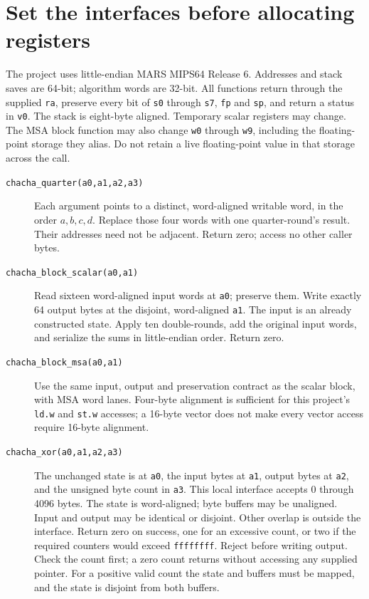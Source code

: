\section{Set the interfaces before allocating registers}
The project uses little-endian MARS MIPS64 Release 6. Addresses and stack saves are
64-bit; algorithm words are 32-bit. All functions return through the supplied
\texttt{ra}, preserve every bit of \texttt{s0} through \texttt{s7}, \texttt{fp} and
\texttt{sp}, and return a status in \texttt{v0}. The stack is eight-byte aligned.
Temporary scalar registers may change. The MSA block function may also change
\texttt{w0} through \texttt{w9}, including the floating-point storage they alias.
Do not retain a live floating-point value in that storage across the call.

\begin{description}
  \item[\texttt{chacha\_quarter(a0,a1,a2,a3)}]
        Each argument points to a distinct, word-aligned writable word, in the order
        \(a,b,c,d\). Replace those four words with one quarter-round's result. Their addresses
        need not be adjacent. Return zero; access no other caller bytes.
  \item[\texttt{chacha\_block\_scalar(a0,a1)}]
        Read sixteen word-aligned input words at \texttt{a0}; preserve them. Write exactly
        64 output bytes at the disjoint, word-aligned \texttt{a1}. The input is an already
        constructed state. Apply ten double-rounds, add the original input words, and serialize
        the sums in little-endian order. Return zero.
  \item[\texttt{chacha\_block\_msa(a0,a1)}]
        Use the same input, output and preservation contract as the scalar block, with MSA
        word lanes. Four-byte alignment is sufficient for this project's \texttt{ld.w} and
        \texttt{st.w} accesses; a 16-byte vector does not make every vector access require
        16-byte alignment.
  \item[\texttt{chacha\_xor(a0,a1,a2,a3)}]
        The unchanged state is at \texttt{a0}, the input bytes at \texttt{a1}, output bytes at
        \texttt{a2}, and the unsigned byte count in \texttt{a3}. This local interface accepts
        0 through 4096 bytes. The state is word-aligned; byte buffers may be unaligned. Input
        and output may be identical or disjoint. Other overlap is outside the interface.
        Return zero on success, one for an excessive count, or two if the required counters
        would exceed \texttt{ffffffff}. Reject before writing output. Check the count first;
        a zero count returns without accessing any supplied pointer. For a positive valid
        count the state and buffers must be mapped, and the state is disjoint from both buffers.
\end{description}

